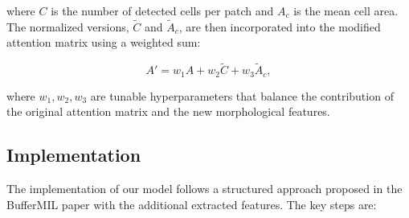\documentclass[10pt,twocolumn]{article}
\begin{document}
where $C$ is the number of detected cells per patch and $A_{c}$ is the mean cell area. The normalized versions, $\tilde{C}$ and $\tilde{A}_{c}$, are then incorporated into the modified attention matrix using a weighted sum:

\begin{equation}
A' = w_1 A + w_2 \tilde{C} + w_3 \tilde{A}_{c},
\end{equation}

where $w_1, w_2, w_3$ are tunable hyperparameters that balance the contribution of the original attention matrix and the new morphological features.

\subsection{Implementation}

The implementation of our model follows a structured approach proposed in the BufferMIL paper with the additional extracted features. The key steps are:
\end{document}

